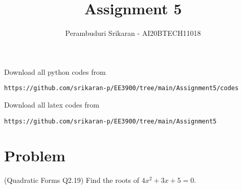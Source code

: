 \documentclass[journal,12pt,twocolumn]{IEEEtran}
\begin{document}
\let\vec\mathbf
\renewcommand{\thefigure}{\theproblem}
\def\putbox#1#2#3{\makebox[0in][l]{\makebox[#1][l]{}\raisebox{\baselineskip}[0in][0in]{\raisebox{#2}[0in][0in]{#3}}}}
     \def\rightbox#1{\makebox[0in][r]{#1}}
     \def\centbox#1{\makebox[0in]{#1}}
     \def\topbox#1{\raisebox{-\baselineskip}[0in][0in]{#1}}
     \def\midbox#1{\raisebox{-0.5\baselineskip}[0in][0in]{#1}}
\vspace{3cm}
\title{Assignment 5}
\author{Perambuduri Srikaran - AI20BTECH11018}
\maketitle
\newpage
\bigskip
\renewcommand{\thefigure}{\theenumi}
\renewcommand{\thetable}{\theenumi}
Download all python codes from
\begin{lstlisting}
https://github.com/srikaran-p/EE3900/tree/main/Assignment5/codes
\end{lstlisting}
Download all latex codes from
\begin{lstlisting}
https://github.com/srikaran-p/EE3900/tree/main/Assignment5
\end{lstlisting}
\section*{Problem}
(Quadratic Forms Q2.19) Find the roots of $4x^2 + 3x + 5 = 0$.
\end{document}
